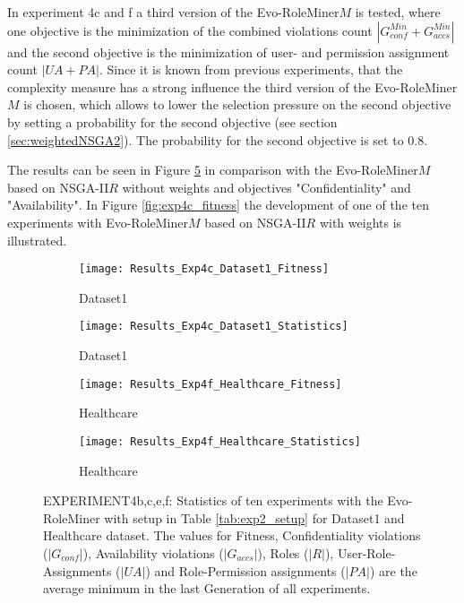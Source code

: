 In experiment 4c and f a third version of the Evo-RoleMiner$M$ is tested, where one objective is the minimization of the combined violations count $|G_{conf}^{Min} + G_{accs}^{Min}|$ and the second objective is the minimization of user- and permission assignment count $|UA + PA|$. Since it is known from previous experiments, that the complexity measure has a strong influence the third version of the Evo-RoleMiner$M$ is chosen, which allows to lower the selection pressure on the second objective by setting a probability for the second objective (see section \ref{sec:weightedNSGA2}). The probability for the second objective is set to 0.8.

The results can be seen in Figure \ref{fig:Results_Exp4} in comparison with the Evo-RoleMiner$M$ based on NSGA-II$R$ without weights and objectives "Confidentiality" and "Availability". In Figure \ref{fig:exp4c_fitness} the development of one of the ten experiments with Evo-RoleMiner$M$ based on NSGA-II$R$ with weights is illustrated.

\begin{figure}[H]
	\centering
	\begin{subfigure}{0.45\textwidth}
		\texttt{[image: Results\_Exp4c\_Dataset1\_Fitness]}
		\caption{Dataset1}
		\label{fig:Results_Exp4c_Dataset1_Fitness}
	\end{subfigure}%
	\begin{subfigure}{0.55\textwidth}
		\centering
		\texttt{[image: Results\_Exp4c\_Dataset1\_Statistics]}
		\caption{Dataset1}
		\label{fig:Results_Exp4c_Dataset1_Statistics}
	\end{subfigure}
	\begin{subfigure}{0.45\textwidth}
		\texttt{[image: Results\_Exp4f\_Healthcare\_Fitness]}
		\caption{Healthcare}
		\label{fig:Results_Exp4f_Healthcare_Fitness}
	\end{subfigure}%
	\begin{subfigure}{0.55\textwidth}
		\centering
		\texttt{[image: Results\_Exp4f\_Healthcare\_Statistics]}
		\caption{Healthcare}
		\label{fig:Results_Exp4f_Healthcare_Statistics}
	\end{subfigure}
	\caption{EXPERIMENT4b,c,e,f: Statistics of ten experiments with the Evo-RoleMiner with setup in Table \ref{tab:exp2_setup} for Dataset1 and Healthcare dataset. The values for Fitness, Confidentiality violations ($|G_{conf}|$), Availability violations ($|G_{accs}|$), Roles ($|R|$), User-Role-Assignments ($|UA|$) and Role-Permission assignments ($|PA|$) are the average minimum in the last Generation of all experiments.}
	\label{fig:Results_Exp4}
\end{figure}

